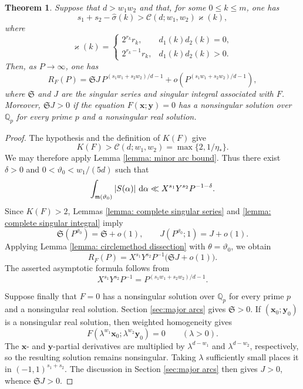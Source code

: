 \documentclass[12pt,reqno]{amsart}
\newtheorem{theorem}{Theorem}[section]
\theoremstyle{definition}
\theoremstyle{remark}
\numberwithin{equation}{section}
\def\bfx{{\mathbf x}}
\def\bfy{{\mathbf y}}
\def\grm{{\mathfrak m}}\def\grM{{\mathfrak M}}
\def\grS{{\mathfrak S}}\def\grP{{\mathfrak P}}
\def\a{{\alpha}} \def\bfalp{{\boldsymbol \alpha}} \def\atil{{\widetilde \alpha}}
\def\d{{\,{\rm d}}}
\begin{document}
\begin{theorem}\label{thm:V1-V2-criterion-precise}
Suppose that $d>w_1w_2$ and that, for some $0\leq k\leq m$, one has
\[
    s_1+s_2-\widehat{\sigma}(k)
    >\mathcal C(d;w_1,w_2)\varkappa(k),
\]
where
\[
    \varkappa(k)=
    \begin{cases}
        2^{r_k}r_k,&d_1(k)d_2(k)=0,\\[2mm]
        2^{r_k-1}r_k,&d_1(k)d_2(k)>0.
    \end{cases}
\]
Then, as $P\to\infty$, one has
\[
    R_F(P)
    =\mathfrak S J\,
    P^{(s_1w_1+s_2w_2)/d-1}
    +o\left(P^{(s_1w_1+s_2w_2)/d-1}\right),
\]
where $\mathfrak S$ and $J$ are the singular series and singular integral
associated with $F$. Moreover, $\mathfrak S J>0$ if the equation
$F(\bfx;\bfy)=0$ has a nonsingular solution over $\mathbb Q_p$ for every
prime $p$ and a nonsingular real solution.
\end{theorem}

\begin{proof}
The hypothesis and the definition of $K(F)$ give
\[
    K(F)>\mathcal C(d;w_1,w_2)
    =\max\{2,1/\eta_*\}.
\]
We may therefore apply Lemma \ref{lemma: minor arc bound}. Thus there
exist $\delta>0$ and $0<\vartheta_0<w_1/(5d)$ such that
\[
    \int_{\grm(\vartheta_0)}|S(\a)|\,\d\a
    \ll X^{s_1}Y^{s_2}P^{-1-\delta}.
\]
Since $K(F)>2$, Lemmas \ref{lemma: complete singular series} and
\ref{lemma: complete singular integral} imply
\[
    \grS(P^{\vartheta_0})=\grS+o(1),
    \qquad
    J(P^{\vartheta_0};1)=J+o(1).
\]
Applying Lemma \ref{lemma: circlemethod dissection} with
$\theta=\vartheta_0$, we obtain
\[
    R_F(P)
    =X^{s_1}Y^{s_2}P^{-1}\bigl(\grS J+o(1)\bigr).
\]
The asserted asymptotic formula follows from
\[
    X^{s_1}Y^{s_2}P^{-1}
    =P^{(s_1w_1+s_2w_2)/d-1}.
\]

Suppose finally that $F=0$ has a nonsingular solution over $\mathbb Q_p$
for every prime $p$ and a nonsingular real solution. Section
\ref{sec:major arcs} gives $\grS>0$. If $(\bfx_0;\bfy_0)$ is a
nonsingular real solution, then weighted homogeneity gives
\[
    F(\lambda^{w_1}\bfx_0;\lambda^{w_2}\bfy_0)=0
    \qquad(\lambda>0).
\]
The $\bfx$- and $\bfy$-partial derivatives are multiplied by
$\lambda^{d-w_1}$ and $\lambda^{d-w_2}$, respectively, so the resulting
solution remains nonsingular. Taking $\lambda$ sufficiently small places
it in $(-1,1)^{s_1+s_2}$. The discussion in Section
\ref{sec:major arcs} then gives $J>0$, whence $\grS J>0$.
\end{proof}
\end{document}

